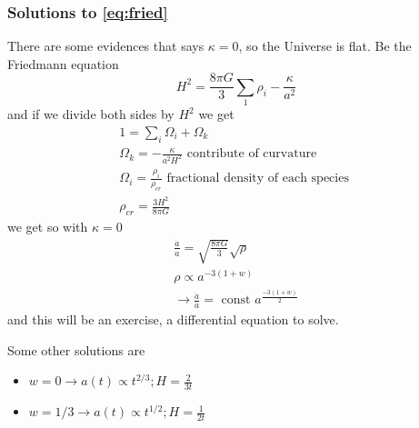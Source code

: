 \subsubsection{Solutions to \ref{eq:fried}}
There are some evidences that says $\kappa =0$, so the Universe is flat. Be the Friedmann equation
\[
H^{2} = \frac{8\pi G}{3}\sum_{1}^{}{\rho _{i}} - \frac{\kappa }{a^{2}}
\]
and if we divide both sides by $H^{2}$ we get
\begin{gather*}
1 = \sum_{i}^{}{\Omega _{i}} + \Omega _{k} \\
\Omega _{k} = - \frac{\kappa }{a^{2}H^{2}} \text{ contribute of curvature }\\
\Omega _{i} = \frac{\rho _{i}}{\rho _{cr}} \text{ fractional density of each species }\\
\rho _{ cr} = \frac{3H^{2}}{8\pi G}
\end{gather*} we get
so with $\kappa  = 0$	
\begin{gather*}
\frac{\dot{a}}{a} = \sqrt{ \frac{8\pi G}{3}} \sqrt{\rho } \\
\rho \propto a ^{ -3 \left( 1+w \right)}\\
\to  \frac{\dot{a}}{a} = \text{ const } a^{ \frac{-3 \left( 1+w \right)}{2}} 
\end{gather*}
and this will be an exercise, a differential equation to solve. 

Some other solutions are
\begin{itemize}
\item $w =0 \to  a\left( t \right) \propto t^{2/3}; H = \frac{2}{3t} $
\item $w = 1/3 \to  a\left( t \right) \propto t^{1/2}; H = \frac{1}{2t}$
\end{itemize}










































